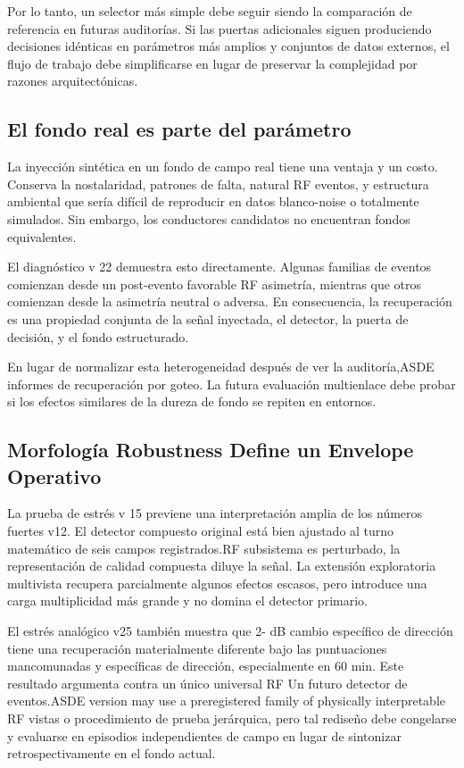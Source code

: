 \documentclass{ieeeaccess}
\begin{document}
Por lo tanto, un selector más simple debe seguir siendo la comparación de referencia en futuras auditorías. Si las puertas adicionales siguen produciendo decisiones idénticas en parámetros más amplios y conjuntos de datos externos, el flujo de trabajo debe simplificarse en lugar de preservar la complejidad por razones arquitectónicas.

\subsection{El fondo real es parte del parámetro}\label{el-fondo-real-es-parte-del-paruxe1metro}

La inyección sintética en un fondo de campo real tiene una ventaja y un costo. Conserva la nostalaridad, patrones de falta, natural RF eventos, y estructura ambiental que sería difícil de reproducir en datos blanco-noise o totalmente simulados. Sin embargo, los conductores candidatos no encuentran fondos equivalentes.

El diagnóstico v 22 demuestra esto directamente. Algunas familias de eventos comienzan desde un post-evento favorable RF asimetría, mientras que otros comienzan desde la asimetría neutral o adversa. En consecuencia, la recuperación es una propiedad conjunta de la señal inyectada, el detector, la puerta de decisión, y el fondo estructurado.

En lugar de normalizar esta heterogeneidad después de ver la auditoría,ASDE informes de recuperación por goteo. La futura evaluación multienlace debe probar si los efectos similares de la dureza de fondo se repiten en entornos.

\subsection{Morfología Robustness Define un Envelope Operativo}\label{morfologuxeda-robustness-define-un-envelope-operativo}

La prueba de estrés v 15 previene una interpretación amplia de los números fuertes v12. El detector compuesto original está bien ajustado al turno matemático de seis campos registrados.RF subsistema es perturbado, la representación de calidad compuesta diluye la señal. La extensión exploratoria multivista recupera parcialmente algunos efectos escasos, pero introduce una carga multiplicidad más grande y no domina el detector primario.

El estrés analógico v25 también muestra que 2- dB cambio específico de dirección tiene una recuperación materialmente diferente bajo las puntuaciones mancomunadas y específicas de dirección, especialmente en 60 min. Este resultado argumenta contra un único universal RF Un futuro detector de eventos.ASDE version may use a preregistered family of physically interpretable RF vistas o procedimiento de prueba jerárquica, pero tal rediseño debe congelarse y evaluarse en episodios independientes de campo en lugar de sintonizar retrospectivamente en el fondo actual.
\end{document}
